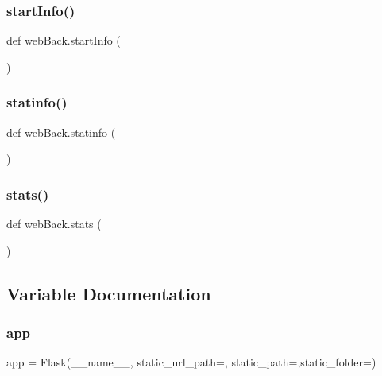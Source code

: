 \hypertarget{namespaceweb_back_aaf96757aed7ac16a95fea349a78f9faf}{}\label{namespaceweb_back_aaf96757aed7ac16a95fea349a78f9faf} 
\subsubsection{\texorpdfstring{start\+Info()}{startInfo()}}
{\footnotesize\ttfamily def web\+Back.\+start\+Info (\begin{DoxyParamCaption}{ }\end{DoxyParamCaption})}

\hypertarget{namespaceweb_back_a37f3ed1601cc23aa04e72ebf237ba3c5}{}\label{namespaceweb_back_a37f3ed1601cc23aa04e72ebf237ba3c5} 
\subsubsection{\texorpdfstring{statinfo()}{statinfo()}}
{\footnotesize\ttfamily def web\+Back.\+statinfo (\begin{DoxyParamCaption}{ }\end{DoxyParamCaption})}

\hypertarget{namespaceweb_back_a251f9bc8dbc3de8ac0e0aa681388d52d}{}\label{namespaceweb_back_a251f9bc8dbc3de8ac0e0aa681388d52d} 
\subsubsection{\texorpdfstring{stats()}{stats()}}
{\footnotesize\ttfamily def web\+Back.\+stats (\begin{DoxyParamCaption}{ }\end{DoxyParamCaption})}



\subsection{Variable Documentation}
\hypertarget{namespaceweb_back_afe63fea7be31b0200b496d08bc6b517d}{}\label{namespaceweb_back_afe63fea7be31b0200b496d08bc6b517d} 
\subsubsection{\texorpdfstring{app}{app}}
{\footnotesize\ttfamily app = Flask(\+\_\+\+\_\+name\+\_\+\+\_\+, static\+\_\+url\+\_\+path=\textquotesingle{}\textquotesingle{}, static\+\_\+path=\textquotesingle{}\textquotesingle{},static\+\_\+folder=\textquotesingle{}\textquotesingle{})}

